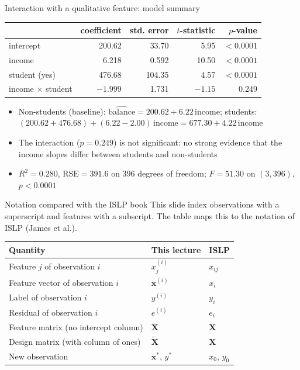 \begin{frame}{Interaction with a qualitative feature: model summary}
    \begin{center}
        \small
        \begin{tabular}{lrrrr}
            \toprule
            & coefficient & std. error & $t$-statistic & $p$-value \\
            \midrule
            intercept & 200.62 & 33.70 & 5.95 & $<0.0001$ \\
            income & 6.218 & 0.592 & 10.50 & $<0.0001$ \\
            student (yes) & 476.68 & 104.35 & 4.57 & $<0.0001$ \\
            income $\times$ student & $-1.999$ & 1.731 & $-1.15$ & 0.249 \\
            \bottomrule
        \end{tabular}
    \end{center}
    \begin{itemize}
        \item Non-students (baseline): $\widehat{\text{balance}} = 200.62 + 6.22\,\text{income}$; students: $(200.62 + 476.68) + (6.22 - 2.00)\,\text{income} = 677.30 + 4.22\,\text{income}$
        \item The interaction ($p = 0.249$) is not significant: no strong evidence that the income slopes differ between students and non-students
        \item $R^2 = 0.280$, $\mathrm{RSE} = 391.6$ on $396$ degrees of freedom; $F = 51.30$ on $(3, 396)$, $p < 0.0001$
    \end{itemize}
\end{frame}


\begin{frame}{Notation compared with the ISLP book}
    This slide index observations with a superscript and features with a subscript. The table maps this to the notation of ISLP (James et al.).
    \begin{center}
        \small
        \begin{tabular}{lll}
            \toprule
            Quantity & This lecture & ISLP \\
            \midrule
            Feature $j$ of observation $i$ & $x_j^{(i)}$ & $x_{ij}$ \\
            Feature vector of observation $i$ & $\mathbf{x}^{(i)}$ & $x_i$ \\
            Label of observation $i$ & $y^{(i)}$ & $y_i$ \\
            Residual of observation $i$ & $e^{(i)}$ & $e_i$ \\
            Feature matrix (no intercept column) & $\mathbf{X}$ & $\mathbf{X}$ \\
            Design matrix (with column of ones) & $\tilde{\mathbf{X}}$ & $\mathbf{X}$ \\
            New observation & $\mathbf{x}^\ast$, $y^\ast$ & $x_0$, $y_0$ \\
            \bottomrule
        \end{tabular}
    \end{center}
\end{frame}


